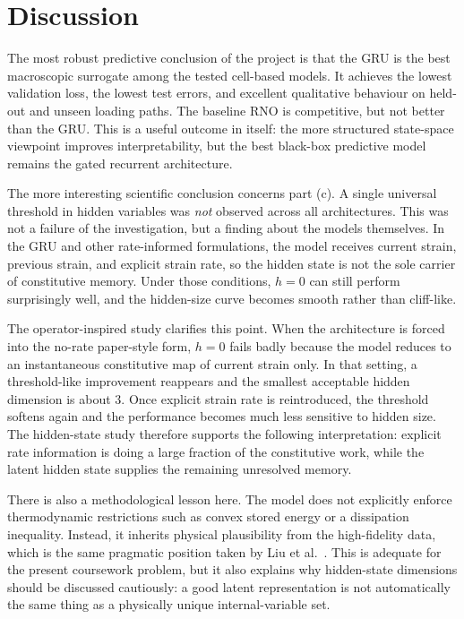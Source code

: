 \documentclass[11pt,a4paper]{article}
\begin{document}
\section{Discussion}

The most robust predictive conclusion of the project is that the GRU is the best macroscopic surrogate among the tested cell-based models. It achieves the lowest validation loss, the lowest test errors, and excellent qualitative behaviour on held-out and unseen loading paths. The baseline RNO is competitive, but not better than the GRU. This is a useful outcome in itself: the more structured state-space viewpoint improves interpretability, but the best black-box predictive model remains the gated recurrent architecture.

The more interesting scientific conclusion concerns part (c). A single universal threshold in hidden variables was \emph{not} observed across all architectures. This was not a failure of the investigation, but a finding about the models themselves. In the GRU and other rate-informed formulations, the model receives current strain, previous strain, and explicit strain rate, so the hidden state is not the sole carrier of constitutive memory. Under those conditions, $h=0$ can still perform surprisingly well, and the hidden-size curve becomes smooth rather than cliff-like.

The operator-inspired study clarifies this point. When the architecture is forced into the no-rate paper-style form, $h=0$ fails badly because the model reduces to an instantaneous constitutive map of current strain only. In that setting, a threshold-like improvement reappears and the smallest acceptable hidden dimension is about $3$. Once explicit strain rate is reintroduced, the threshold softens again and the performance becomes much less sensitive to hidden size. The hidden-state study therefore supports the following interpretation: explicit rate information is doing a large fraction of the constitutive work, while the latent hidden state supplies the remaining unresolved memory.

There is also a methodological lesson here. The model does not explicitly enforce thermodynamic restrictions such as convex stored energy or a dissipation inequality. Instead, it inherits physical plausibility from the high-fidelity data, which is the same pragmatic position taken by Liu et al.~\cite{Liu_2023}. This is adequate for the present coursework problem, but it also explains why hidden-state dimensions should be discussed cautiously: a good latent representation is not automatically the same thing as a physically unique internal-variable set.
\end{document}
